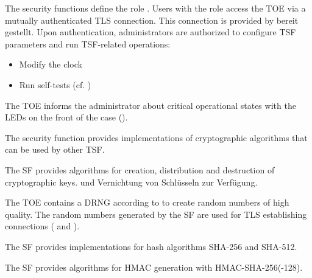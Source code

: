 
The security functions define the role . Users with the
role  access the TOE via a mutually authenticated TLS
connection. This connection is provided by
 bereit gestellt. Upon authentication, administrators are authorized to configure TSF parameters and run TSF-related operations:

\begin{itemize}
\item Modify the clock
\item Run self-tests (cf. )
\end{itemize}

The TOE informs the administrator about critical operational states with the
LEDs on the front of the case ().



The security function  provides
implementations of cryptographic algorithms that can be used by other TSF.


The SF provides algorithms for creation, distribution and destruction of
cryptographic keys.  und Vernichtung von Schlüsseln zur Verfügung.



The TOE contains a DRNG according to  to create
random numbers of high quality. The random numbers generated by the SF are used
for TLS establishing connections ( and
).



The SF provides implementations for hash algorithms SHA-256 and SHA-512.



The SF provides algorithms for HMAC generation with HMAC-SHA-256(-128).

